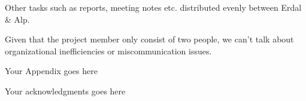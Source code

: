 \documentclass{mefsdp}
\begin{document}
	Other tasks such as reports, meeting notes etc. distributed evenly between Erdal \& Alp.\newline \par
	
	Given that the project member only consist of two people, we can't talk about organizational inefficiencies or miscommunication issues. 
	
	\begin{appendix}[A]
	\end{appendix}

	\begin{appendix}[B]
		Your Appendix goes here
	\end{appendix}
	
	\begin{acknowledgments}
		Your acknowledgments goes here
	\end{acknowledgments}
	
	
	
\end{document}
